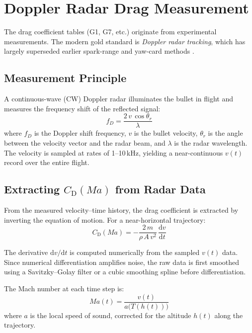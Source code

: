 \documentclass[11pt,twoside,openright]{report}
\newcommand{\dd}{\mathrm{d}}
\newcommand{\Cd}{C_{\mathrm{D}}}
\newcommand{\Mach}{\mathit{Ma}}
\begin{document}
\section{Doppler Radar Drag Measurement}
\label{sec:doppler}

The drag coefficient tables (G1, G7, etc.) originate from experimental measurements. The modern gold standard is \emph{Doppler radar tracking}, which has largely superseded earlier spark-range and yaw-card methods \citep{mccoy1999modern, braun1958aerodynamic}.

\subsection{Measurement Principle}

A continuous-wave (CW) Doppler radar illuminates the bullet in flight and measures the frequency shift of the reflected signal:
\begin{equation}
  f_D = \frac{2\,v\,\cos\theta_r}{\lambda}
  \label{eq:doppler_freq}
\end{equation}
where $f_D$ is the Doppler shift frequency, $v$ is the bullet velocity, $\theta_r$ is the angle between the velocity vector and the radar beam, and $\lambda$ is the radar wavelength. The velocity is sampled at rates of 1--10\,kHz, yielding a near-continuous $v(t)$ record over the entire flight.

\subsection{Extracting $\Cd(\Mach)$ from Radar Data}

From the measured velocity--time history, the drag coefficient is extracted by inverting the equation of motion. For a near-horizontal trajectory:
\begin{equation}
  \Cd(\Mach) = -\frac{2\,m}{\rho\,A\,v^2}\,\frac{\dd v}{\dd t}
  \label{eq:cd_from_radar}
\end{equation}

The derivative $\dd v/\dd t$ is computed numerically from the sampled $v(t)$ data. Since numerical differentiation amplifies noise, the raw data is first smoothed using a Savitzky--Golay filter or a cubic smoothing spline before differentiation.

The Mach number at each time step is:
\begin{equation}
  \Mach(t) = \frac{v(t)}{a\bigl(T(h(t))\bigr)}
  \label{eq:mach_from_radar}
\end{equation}
where $a$ is the local speed of sound, corrected for the altitude $h(t)$ along the trajectory.
\end{document}
